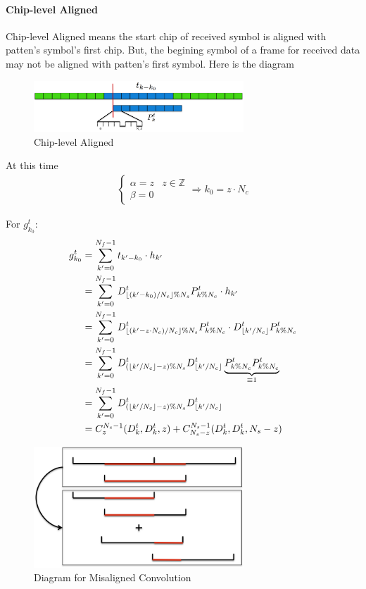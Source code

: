 \documentclass[a4paper]{report}
\DeclarePairedDelimiter\floor{\lfloor}{\rfloor}
\begin{document}
\paragraph{Chip-level Aligned} %
\label{par:chip_level_aligned}
Chip-level Aligned means the start chip of received symbol is aligned with patten's symbol's first chip. But, the begining symbol of a frame for received data may not be aligned with patten's first symbol. Here is the diagram
\begin{figure}[ht]
	\centering
	\includegraphics[width = 3.1in]{figure/chip_level_aligned.png}
	\caption{Chip-level Aligned}
	\label{fig:Chip-level aligned}
\end{figure}

At this time
\begin{align}
	\begin{cases}
		\alpha = z &z \in \mathbb{Z}\\
		\beta = 0 &
	\end{cases}
	\Rightarrow k_0 = z \cdot N_c
\end{align}

For $g^t_{k_0}$: \label{eq:chip-level aligned-training}
\begin{align}
	g^t_{k_0}
	&= \sum_{k' = 0}^{N_f-1} t_{k'-k_0} \cdot h_{k'}\\
	&= \sum_{k' = 0}^{N_f-1} D^t_{\floor{(k'-k_0) / N_c}\%N_s} P^t_{k \% N_c} \cdot h_{k'}\\
	&= \sum_{k' = 0}^{N_f-1} D^t_{\floor{(k'-z \cdot N_c) / N_c}\%N_s} P^t_{k \% N_c} \cdot D^t_{\floor{k'/N_c}} P^t_{k \% N_c}\\
	&= \sum_{k' = 0}^{N_f-1} D^t_{(\floor{k' / N_c} - z)\%N_s} D^t_{\floor{k'/N_c}} \underbrace{P^t_{k \% N_c} P^t_{k \% N_c}}_{\equiv 1}\\
	&= \sum_{k' = 0}^{N_f-1} D^t_{(\floor{k' / N_c} - z)\%N_s} D^t_{\floor{k'/N_c}}\\
	&= C_z^{N_s-1}(D_k^t, D_k^t, z) + C_{N_s - z}^{N_s-1}(D_k^t, D_k^t, N_s - z)
\end{align}
\begin{figure}[ht]
	\centering
	\includegraphics[width=3.1in]{figure/misaligned_conv.png}
	\caption{Diagram for Misaligned Convolution}
	\label{fig:Diagram for Misaligned Convolution}
\end{figure}
\end{document}
